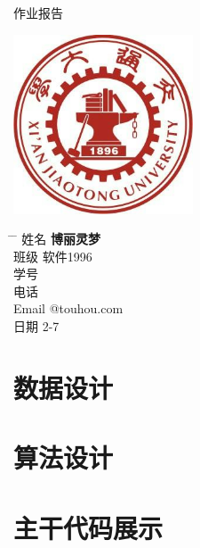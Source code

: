 \documentclass[UTF8]{ctexart}
\begin{document}
\begin{titlepage}
    \begin{center}
        \Huge{作业报告}
        \noindent{\color{BrickRed} \rule{\linewidth}{1mm}}
        \Huge
        \vspace{0.5cm}
		\LARGE
		\vspace{1.5cm}
		\textbf{}

        \includegraphics[width=0.4\textwidth]{school_emblem.png}

        \vspace{1.5cm}
    \end{center}
    \Large
    \begin{tabbing}
        \hspace*{1em}\= \hspace*{8em} \= \kill %
        \> 姓名 \>  \textbf{博丽灵梦} \\
        \> 班级 \>  软件1996 \\
        \> 学号   \\
        \> 电话   \\
        \> Email @touhou.com \\
        \> 日期 2{-}7
    \end{tabbing}
    
\end{titlepage}
\setlength{\headheight}{21.89642pt}
\tableofcontents
\newpage{}
\section{数据设计}
\section{算法设计}
\section{主干代码展示}
\end{document}
